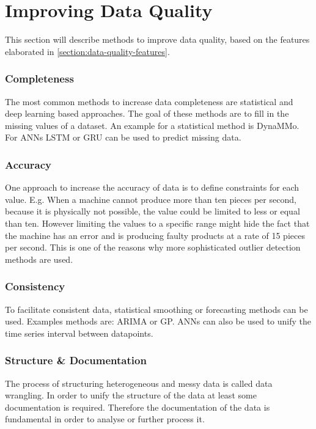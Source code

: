 \section{Improving Data Quality}\label{section:imrpoving-data-quality}
This section will describe methods to improve data quality, based on the features elaborated in \autoref{section:data-quality-features}.
\subsubsection{Completeness}
The most common methods to increase data completeness are statistical and deep learning based approaches. The goal of these methods are to fill in the missing values of a dataset. An example for a statistical method is DynaMMo\cite{liDynaMMoMiningSummarization2009}. For \acp{ANN} \ac{LSTM} or \ac{GRU} can be used to predict missing data. \cite{songIoTDataQuality2020}
\subsubsection{Accuracy}
One approach to increase the accuracy of data is to define constraints for each value. E.g. When a machine cannot produce more than ten pieces per second, because it is physically not possible, the value could be limited to less or equal than ten. However limiting the values to a specific range might hide the fact that the machine  has an error and is producing faulty products at a rate of 15 pieces per second. This is one of the reasons why more sophisticated outlier detection methods are used. \cite{songIoTDataQuality2020}

\subsubsection{Consistency}
To facilitate consistent data, statistical smoothing or forecasting methods can be used. Examples methods are: \ac{ARIMA} or \ac{GP}. \acp{ANN} can also be used to unify the time series interval between datapoints. \cite{songIoTDataQuality2020}

\subsubsection{Structure \& Documentation}
The process of structuring heterogeneous and messy data is called data wrangling. In order to unify the structure of the data at least some documentation is required. Therefore the documentation of the data is fundamental in order to analyse or further process it. 

